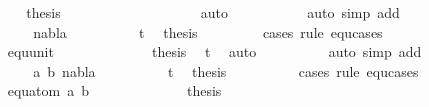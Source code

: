 \begin{isabellebody}
\ \ \ \ \ \ \ \ \ \ \ \isamarkupfalse%
\ \isamarkupfalse%
\ {\isacharquery}{\kern0pt}thesis\ \isanewline
\ \ \ \ \ \ \ \ \ \ \ \ \ \isamarkupfalse%
\ {}\ {}{\isacharparenleft}{\kern0pt}{}{\isacharcomma}{\kern0pt}{}{\isacharcomma}{\kern0pt}{}{\isacharcomma}{\kern0pt}{}{\isacharparenright}{\kern0pt}\ \isamarkupfalse%
\ auto\isanewline
\ \ \ \ \ \ \ \ \ \isamarkupfalse%
\ {\isacharparenleft}{\kern0pt}auto\ simp\ add{\isacharcolon}{\kern0pt}\ {}{\isacharparenright}{\kern0pt}\isanewline
\ \ \ \ \ \isamarkupfalse%
\isanewline
\ \ \ \ \ \ \ \isamarkupfalse%
\ {\isacharparenleft}{\kern0pt}{}\ nabla{\isacharparenright}{\kern0pt}\isanewline
\ \ \ \ \ \ \ \ \isamarkupfalse%
\ t{}{}\ \isamarkupfalse%
\ {\isacharquery}{\kern0pt}thesis\isanewline
\ \ \ \ \ \ \ \ \isamarkupfalse%
{\isacharparenleft}{\kern0pt}cases\ rule{\isacharcolon}{\kern0pt}\ equ{\isachardot}{\kern0pt}cases{\isacharparenright}{\kern0pt}\isanewline
\ \ \ \ \ \ \ \ \ \ \isamarkupfalse%
\ equ{\isacharunderscore}{\kern0pt}unit\isanewline
\ \ \ \ \ \ \ \ \ \ \isamarkupfalse%
\ \isamarkupfalse%
\ {\isacharquery}{\kern0pt}thesis\ \isamarkupfalse%
\ t{}{}\ \isamarkupfalse%
\ auto\isanewline
\ \ \ \ \ \ \ \ \isamarkupfalse%
\ {\isacharparenleft}{\kern0pt}auto\ simp\ add{\isacharcolon}{\kern0pt}\ {}{\isacharparenright}{\kern0pt}\isanewline
\ \ \ \ \ \isamarkupfalse%
\isanewline
\ \ \ \ \ \ \ \isamarkupfalse%
\ {\isacharparenleft}{\kern0pt}{}\ a\ b\ nabla{\isacharparenright}{\kern0pt}\isanewline
\ \ \ \ \ \ \ \ \isamarkupfalse%
\ t{}{}\ \isamarkupfalse%
\ {\isacharquery}{\kern0pt}thesis\ \isanewline
\ \ \ \ \ \ \ \ \isamarkupfalse%
{\isacharparenleft}{\kern0pt}cases\ rule{\isacharcolon}{\kern0pt}\ equ{\isachardot}{\kern0pt}cases{\isacharparenright}{\kern0pt}\isanewline
\ \ \ \ \ \ \ \ \ \ \isamarkupfalse%
\ {\isacharparenleft}{\kern0pt}equ{\isacharunderscore}{\kern0pt}atom\ a\ b{\isacharparenright}{\kern0pt}\isanewline
\ \ \ \ \ \ \ \ \ \ \isamarkupfalse%
\ \isamarkupfalse%
\ {\isacharquery}{\kern0pt}thesis\isanewline
\ \ \ \ \ \ \ \ \ \ \ \ \isamarkupfalse%

\end{isabellebody}
